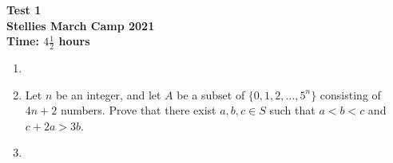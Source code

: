 \documentclass{article}
\begin{document}
\thispagestyle{empty}

\begin{center}
  \textbf{\Large Test 1}
  \\ \vspace{1em}
  \textbf{\large Stellies March Camp 2021}
  \\ \vspace{1em}
  \textbf{\large Time: $4\frac{1}{2}$ hours}
\end{center}

\vspace{24pt}

\begin{enumerate}[itemsep=12pt]

\item %


\item %
Let $n$ be an integer, and let $A$ be a subset of $\{0, 1, 2, \dotsc, 5^n\}$ consisting of $4n+2$ numbers.
Prove that there exist $a, b, c \in S$ such that $a < b < c$ and $c +2a > 3b$.

\item %


\end{enumerate}

\vfill
\centering
\begin{BVerbatim}
\end{BVerbatim}
\end{document}
